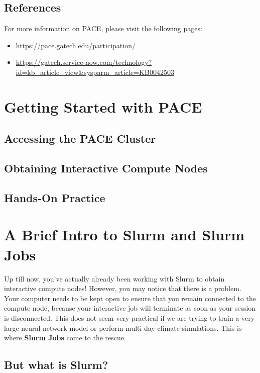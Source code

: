 \documentclass{article}
\begin{document}
\subsection{References}

For more information on PACE, please visit the following pages:
\begin{itemize}
    \item \url{https://pace.gatech.edu/participation/}
    \item \url{https://gatech.service-now.com/technology?id=kb_article_view&sysparm_article=KB0042503}
\end{itemize}

\section{Getting Started with PACE}

\subsection{Accessing the PACE Cluster}

\subsection{Obtaining Interactive Compute Nodes}

\subsection{Hands-On Practice}

\section{A Brief Intro to Slurm and Slurm Jobs}

Up till now, you've actually already been working with Slurm to obtain interactive compute nodes! However, you may notice that there is a problem. Your computer needs to be kept open to ensure that you remain connected to the compute node, because your interactive job will terminate as soon as your session is disconnected. This does not seem very practical if we are trying to train a very large neural network model or perform multi-day climate simulations. This is where \textbf{Slurm Jobs} come to the rescue. 

\subsection{But what is Slurm?}
\end{document}
